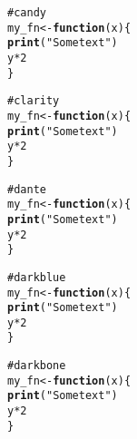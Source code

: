\documentclass[12pt]{article}\usepackage{graphicx, color}
\makeatletter
\newcommand{\hlfunctioncall}[1]{\textcolor[rgb]{0.188235294117647,0.650980392156863,0.188235294117647}{\textbf{#1}}}%
\newcommand{\hlstring}[1]{\textcolor[rgb]{0.850980392156863,1,0.466666666666667}{#1}}%
\newcommand{\hlcomment}[1]{\textcolor[rgb]{0.533333333333333,0.533333333333333,0.533333333333333}{#1}}%
\newenvironment{kframe}{%
 \def\at@end@of@kframe{}%
 \ifinner\ifhmode%
  \def\at@end@of@kframe{\end{minipage}}%
  \begin{minipage}{\columnwidth}%
 \fi\fi%
 \def\FrameCommand##1{\hskip\@totalleftmargin \hskip-\fboxsep
 \colorbox{shadecolor}{##1}\hskip-\fboxsep
     \hskip-\linewidth \hskip-\@totalleftmargin \hskip\columnwidth}%
 \MakeFramed {\advance\hsize-\width
   \@totalleftmargin\z@ \linewidth\hsize
   \@setminipage}}%
 {\par\unskip\endMakeFramed%
 \at@end@of@kframe}
\newenvironment{knitrout}{}{} %
\makeatother
\begin{document}
\begin{knitrout}
\color{fgcolor}\begin{kframe}
\begin{alltt}
\hlcomment{# candy}
my_fn <- \hlfunctioncall{function}(x) \{
    \hlfunctioncall{print}(\hlstring{"Some text"})
    y * 2
\}
\end{alltt}
\end{kframe}
\end{knitrout}





\begin{knitrout}
\color{fgcolor}\begin{kframe}
\begin{alltt}
\hlcomment{# clarity}
my_fn <- \hlfunctioncall{function}(x) \{
    \hlfunctioncall{print}(\hlstring{"Some text"})
    y * 2
\}
\end{alltt}
\end{kframe}
\end{knitrout}





\begin{knitrout}
\color{fgcolor}\begin{kframe}
\begin{alltt}
\hlcomment{# dante}
my_fn <- \hlfunctioncall{function}(x) \{
    \hlfunctioncall{print}(\hlstring{"Some text"})
    y * 2
\}
\end{alltt}
\end{kframe}
\end{knitrout}





\begin{knitrout}
\color{fgcolor}\begin{kframe}
\begin{alltt}
\hlcomment{# darkblue}
my_fn <- \hlfunctioncall{function}(x) \{
    \hlfunctioncall{print}(\hlstring{"Some text"})
    y * 2
\}
\end{alltt}
\end{kframe}
\end{knitrout}





\begin{knitrout}
\color{fgcolor}\begin{kframe}
\begin{alltt}
\hlcomment{# darkbone}
my_fn <- \hlfunctioncall{function}(x) \{
    \hlfunctioncall{print}(\hlstring{"Some text"})
    y * 2
\}
\end{alltt}
\end{kframe}
\end{knitrout}
\end{document}
